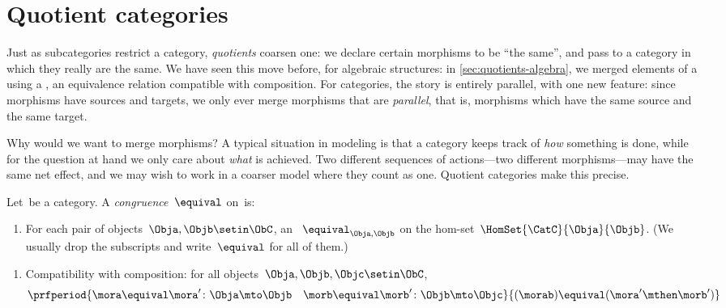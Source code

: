

\section{Quotient categories}
\label{sec:quotient-categories}


Just as subcategories restrict a category, \emph{quotients} coarsen one: we declare certain morphisms to be ``the same'', and pass to a category in which they really are the same.
We have seen this move before, for algebraic structures: in \cref{sec:quotients-algebra}, we merged elements of a  using a , an equivalence relation compatible with composition.
For categories, the story is entirely parallel, with one new feature: since morphisms have sources and targets, we only ever merge morphisms that are \emph{parallel}, that is, morphisms which have the same source and the same target.

Why would we want to merge morphisms?
A typical situation in modeling is that a category keeps track of \emph{how} something is done, while for the question at hand we only care about \emph{what} is achieved.
Two different sequences of actions---two different morphisms---may have the same net effect, and we may wish to work in a coarser model where they count as one.
Quotient categories make this precise.

\begin{ctdefinition}
    \label{def:congruence-category}
    Let~\CatC be a category.
    A \emph{congruence}~$\equival$ on~\CatC is:

    \constit

    \begin{enumerate}
        \item For each pair of objects~$\Obja, \Objb \setin \ObC$, an ~$\equival_{\Obja,\Objb}$ on the hom-set~$\HomSet{\CatC}{\Obja}{\Objb}$.
              (We usually drop the subscripts and write~$\equival$ for all of them.)
    \end{enumerate}

    \condit

    \begin{enumerate}
        \item Compatibility with composition: for all objects~$\Obja, \Objb, \Objc \setin \ObC$,
              \begin{equation}
                  \label{eq:cat-congruence-compatibility}
                  \prfperiod{
                      \mora \equival \mora' \colon \Obja \mto \Objb
                      \quad
                      \morb \equival \morb' \colon \Objb \mto \Objc
                  }{
                      (\morab) \equival (\mora' \mthen \morb')
                  }
              \end{equation}
    \end{enumerate}
\end{ctdefinition}

